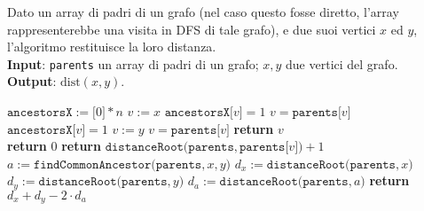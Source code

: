 \documentclass[14pt]{extreport}
\theoremstyle{definition}
\theoremstyle{definition}
\begin{document}
\begin{algorithm}[H]
    \caption{
        Dato un array di padri di un grafo (nel caso questo fosse diretto, l'array rappresenterebbe una visita in DFS di tale grafo), e due suoi vertici $x$ ed $y$, l'algoritmo restituisce la loro distanza.\\
        \textbf{Input}: \texttt{parents} un array di padri di un grafo; $x, y$ due vertici del grafo.\\
        \textbf{Output}: $\mathrm{dist}(x, y)$.
    }

    \begin{algorithmic}[1]
            \State $\texttt{ancestorsX} := \texttt{[}0\texttt{]} * n$
            \State $v := x$
                \State $\texttt{ancestorsX[}v\texttt{]} = 1$
                \State $v = \texttt{parents[}v\texttt{]}$
            \EndWhile
            \State $\texttt{ancestorsX[}v\texttt{]} = 1$
            \State $v := y$
                \State $v = \texttt{parents[}v\texttt{]}$
            \EndWhile
            \State \textbf{return} $v$
        \EndFunction
        \\
                \State \textbf{return} $0$
            \Else
            \State \textbf{return} $\texttt{distanceRoot(parents}, \texttt{parents[}v\texttt{])} + 1$
            \EndIf
        \EndFunction
        \\
            \State $a := \texttt{findCommonAncestor(parents}, x, y\texttt{)}$
            \State $d_x := \texttt{distanceRoot(parents}, x\texttt{)}$
            \State $d_y := \texttt{distanceRoot(parents}, y\texttt{)}$
            \State $d_a := \texttt{distanceRoot(parents}, a\texttt{)}$
            \State \textbf{return} $d_x + d_y - 2 \cdot d_a$
        \EndFunction
    \end{algorithmic}
\end{algorithm}
\end{document}
